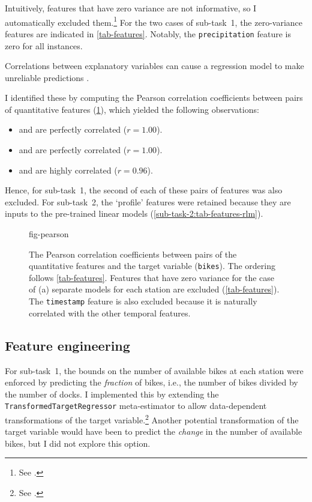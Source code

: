 Intuitively, features that have zero variance are not informative, so I automatically
excluded them.\footnote{See .} For the
two cases of sub-task~1, the zero-variance features are indicated in
\cref{tab-features}.
Notably, the \texttt{precipitation} feature is zero for all instances.

Correlations between explanatory variables can cause a regression model to make
unreliable predictions \parencite{Alin2010}.
\begin{samepage}
  I identified these by computing the Pearson correlation
  coefficients between pairs of quantitative features (\cref{fig-pearson}), which
  yielded the following observations:
  \begin{itemize}
    \item \texttt{\bikesavgfull} and \texttt{\bikesavgshort} are perfectly correlated ($r = 1.00$).
    \item \texttt{\bikeshdiffavgfull} and \texttt{\bikeshdiffavgshort} are perfectly correlated ($r  = 1.00$).
    \item \texttt{\windspeedmax} and \texttt{\windspeedavg} are highly correlated ($r = 0.96$).
  \end{itemize}
\end{samepage}
Hence, for sub-task~1, the second of each of these pairs of features was also excluded.
For sub-task~2, the `profile' features were retained because they are inputs to the
pre-trained linear models (\cref{sub-task-2:tab-features-rlm}).

\begin{figure}
  \centering
  {fig-pearson}
  \caption{
    The Pearson correlation coefficients between pairs of the quantitative features and
    the target variable (\texttt{bikes}).
    The ordering follows \cref{tab-features}.
    Features that have zero variance for the case of (a) separate models for each station
    are excluded (\cref{tab-features}).
    The \texttt{timestamp} feature is also excluded because it is naturally correlated with
    the other temporal features.
  }
  \label{fig-pearson}
\end{figure}

\subsection{Feature engineering}
\label{sec:data-analysis:feature-engineering}

For sub-task~1, the bounds on the number of available bikes at each station were
enforced by predicting the \emph{fraction} of bikes, i.e., the number of bikes divided
by the number of docks.
I implemented this by extending the \texttt{TransformedTargetRegressor} meta-estimator
to allow data-dependent transformations of the target variable.\footnote{See
  .
}
Another potential transformation of the target variable would have been to predict the
\emph{change} in the number of available bikes, but I did not explore this option.

